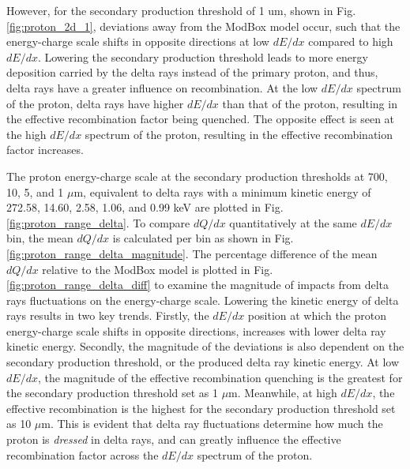 However, for the secondary production threshold of 1 um, shown in Fig. \ref{fig:proton_2d_1}, deviations away from the ModBox model occur, such that the energy-charge scale shifts in opposite directions at low $dE/dx$ compared to high $dE/dx$. 
Lowering the secondary production threshold leads to more energy deposition carried by the delta rays instead of the primary proton, and thus, delta rays have a greater influence on recombination.
At the low $dE/dx$ spectrum of the proton, delta rays have higher $dE/dx$ than that of the proton, resulting in the effective recombination factor being quenched. 
The opposite effect is seen at the high $dE/dx$ spectrum of the proton, resulting in the effective recombination factor increases.

The proton energy-charge scale at the secondary production thresholds at 700, 10, 5, and 1 $\mu$m, equivalent to delta rays with a minimum kinetic energy of 272.58, 14.60, 2.58, 1.06, and 0.99 keV are plotted in Fig. \ref{fig:proton_range_delta}. 
To compare $dQ/dx$ quantitatively at the same $dE/dx$ bin, the mean $dQ/dx$ is calculated per bin as shown in Fig. \ref{fig:proton_range_delta_magnitude}.
The percentage difference of the mean $dQ/dx$ relative to the ModBox model is plotted in Fig. \ref{fig:proton_range_delta_diff} to examine the magnitude of impacts from delta rays fluctuations on the energy-charge scale. 
Lowering the kinetic energy of delta rays results in two key trends.                                                           
Firstly, the $dE/dx$ position at which the proton energy-charge scale shifts in opposite directions, increases with lower delta ray kinetic energy. 
Secondly, the magnitude of the deviations is also dependent on the secondary production threshold, or the produced delta ray kinetic energy. 
At low $dE/dx$, the magnitude of the effective recombination quenching is the greatest for the secondary production threshold set as 1 $\mu$m. 
Meanwhile, at high $dE/dx$, the effective recombination is the highest for the secondary production threshold set as 10 $\mu$m. 
This is evident that delta ray fluctuations determine how much the proton is \textit{dressed} in delta rays, and can greatly influence the effective recombination factor across the $dE/dx$ spectrum of the proton. 
